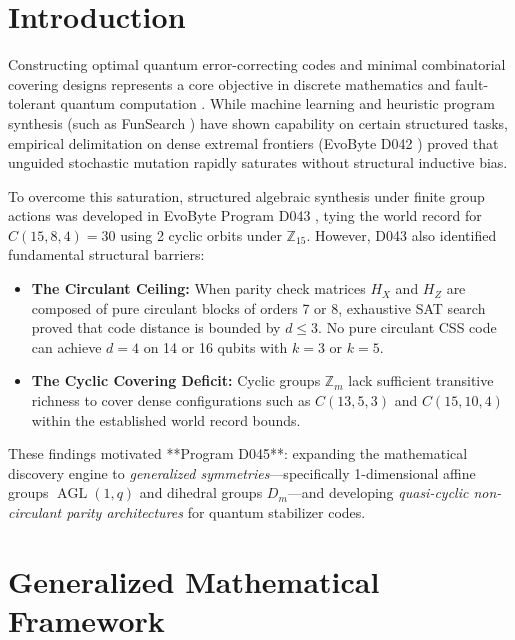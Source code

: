\documentclass[11pt,a4paper]{article}
\begin{document}
\section{Introduction}
\label{sec:intro}
Constructing optimal quantum error-correcting codes and minimal combinatorial covering designs represents a core objective in discrete mathematics and fault-tolerant quantum computation \cite{mills1979sqs, gottesman1996stabilizer, steane1996error, shor1995scheme, calderbank1998quantum}. While machine learning and heuristic program synthesis (such as FunSearch \cite{romeraparedes2024nature}) have shown capability on certain structured tasks, empirical delimitation on dense extremal frontiers (EvoByte D042 \cite{zanata2026frontier}) proved that unguided stochastic mutation rapidly saturates without structural inductive bias.

To overcome this saturation, structured algebraic synthesis under finite group actions was developed in EvoByte Program D043 \cite{zanata2026structured}, tying the world record for $C(15, 8, 4) = 30$ using 2 cyclic orbits under $\mathbb{Z}_{15}$. However, D043 also identified fundamental structural barriers:
\begin{itemize}
    \item \textbf{The Circulant Ceiling:} When parity check matrices $H_X$ and $H_Z$ are composed of pure circulant blocks of orders 7 or 8, exhaustive SAT search proved that code distance is bounded by $d \le 3$. No pure circulant CSS code can achieve $d=4$ on 14 or 16 qubits with $k=3$ or $k=5$.
    \item \textbf{The Cyclic Covering Deficit:} Cyclic groups $\mathbb{Z}_m$ lack sufficient transitive richness to cover dense configurations such as $C(13, 5, 3)$ and $C(15, 10, 4)$ within the established world record bounds.
\end{itemize}

These findings motivated **Program D045**: expanding the mathematical discovery engine to \emph{generalized symmetries}---specifically 1-dimensional affine groups $\operatorname{AGL}(1, q)$ and dihedral groups $D_m$---and developing \emph{quasi-cyclic non-circulant parity architectures} for quantum stabilizer codes.

\section{Generalized Mathematical Framework}
\label{sec:framework}
\end{document}
